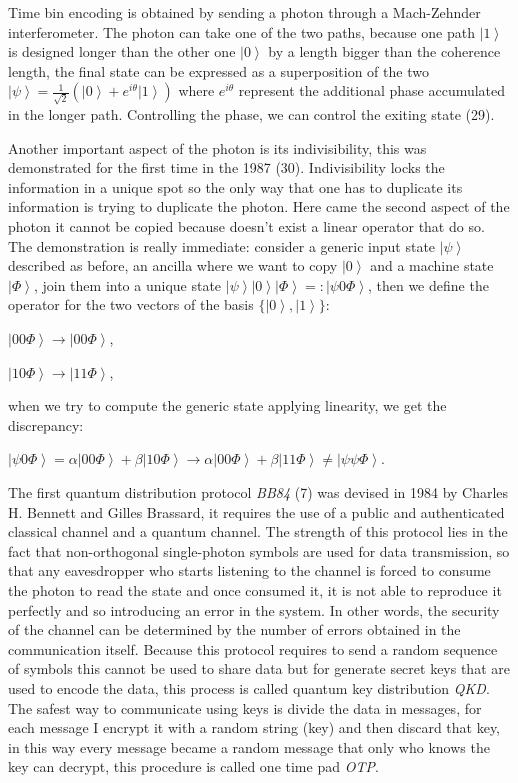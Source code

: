 Time bin encoding is obtained by sending a photon through a Mach-Zehnder interferometer. The photon can take one of the two paths, because one path $\left|1\right>$ is designed longer than the other one $\left|0\right>$ by a length bigger than the coherence length, the final state can be expressed as a superposition of the two $\left|\psi\right> = \frac{1}{\sqrt{2}} (\left|0\right> + e^{i\theta}\left|1\right>)$ where $e^{i \theta}$ represent the additional phase accumulated in the longer path. Controlling the phase, we can control the exiting state (29).

Another important aspect of the photon is its indivisibility, this was demonstrated for the first time in the 1987 (30). Indivisibility locks the information in a unique spot so the only way that one has to duplicate its information is trying to duplicate the photon. Here came the second aspect of the photon it cannot be copied because doesn't exist a linear operator that do so. The demonstration is really immediate: consider a generic input state $\left|\psi\right>$ described as before, an ancilla where we want to copy $\left|0\right>$ and a machine state $\left|\Phi\right>$, join them into a unique state $\left|\psi\right>\left|0\right>\left|\Phi\right> =: \left|\psi 0 \Phi\right>$, then we define the operator for the two vectors of the basis $\{\left|0\right>, \left|1\right>\}$:

$\left|0 0 \Phi\right> \to \left|0 0 \Phi\right>$,

$\left|1 0 \Phi\right> \to \left|1 1 \Phi\right>$,

when we try to compute the generic state applying linearity, we get the discrepancy:

$\left|\psi 0 \Phi\right> = \alpha\left|0 0 \Phi\right> + \beta\left|1 0 \Phi\right> \to \alpha\left|0 0 \Phi\right> + \beta\left|1 1 \Phi\right> \ne \left|\psi \psi \Phi\right>$.



The first quantum distribution protocol \textit{BB84} (7) was devised in 1984 by Charles H. Bennett and Gilles Brassard, it requires the use of a public and authenticated classical channel and a quantum channel. The strength of this protocol lies in the fact that non-orthogonal single-photon symbols are used for data transmission, so that any eavesdropper who starts listening to the channel is forced to consume the photon to read the state and once consumed it, it is not able to reproduce it perfectly and so introducing an error in the system. In other words, the security of the channel can be determined by the number of errors obtained in the communication itself.  Because this protocol requires to send a random sequence of symbols this cannot be used to share data but for generate secret keys that are used to encode the data, this process is called quantum key distribution \textit{QKD}. The safest way to communicate using keys is divide the data in messages, for each message I encrypt it with a random string (key) and then discard that key, in this way every message became a random message that only who knows the key can decrypt, this procedure is called one time pad \textit{OTP}.


